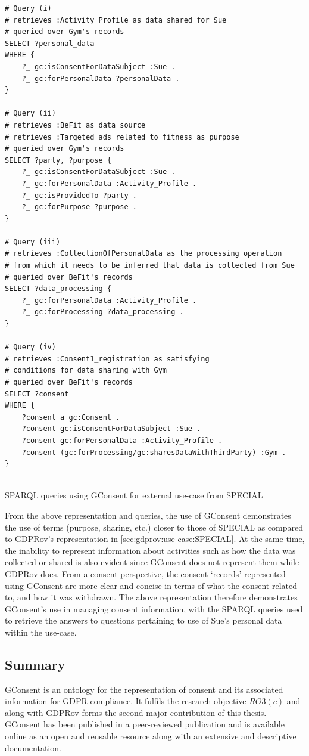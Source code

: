 \begin{listing}[htbp]
\begin{verbatim}
# Query (i)
# retrieves :Activity_Profile as data shared for Sue
# queried over Gym's records
SELECT ?personal_data
WHERE {
	?_ gc:isConsentForDataSubject :Sue .
	?_ gc:forPersonalData ?personalData .
}

# Query (ii)
# retrieves :BeFit as data source
# retrieves :Targeted_ads_related_to_fitness as purpose
# queried over Gym's records
SELECT ?party, ?purpose {
	?_ gc:isConsentForDataSubject :Sue .
	?_ gc:forPersonalData :Activity_Profile .
	?_ gc:isProvidedTo ?party .
	?_ gc:forPurpose ?purpose .
}

# Query (iii)
# retrieves :CollectionOfPersonalData as the processing operation
# from which it needs to be inferred that data is collected from Sue
# queried over BeFit's records
SELECT ?data_processing {
    ?_ gc:forPersonalData :Activity_Profile .
    ?_ gc:forProcessing ?data_processing .
}

# Query (iv)
# retrieves :Consent1_registration as satisfying
# conditions for data sharing with Gym
# queried over BeFit's records
SELECT ?consent
WHERE {
	?consent a gc:Consent .
	?consent gc:isConsentForDataSubject :Sue .
	?consent gc:forPersonalData :Activity_Profile .
	?consent (gc:forProcessing/gc:sharesDataWithThirdParty) :Gym .
}


\end{verbatim}
\caption{SPARQL queries using GConsent for external use-case from SPECIAL}
\label{code:gconsent:use-case:special-sparql}
\end{listing}

From the above representation and queries, the use of GConsent demonstrates the use of terms (purpose, sharing, etc.) closer to those of SPECIAL as compared to GDPRov's representation in \autoref{sec:gdprov:use-case:SPECIAL}.
At the same time, the inability to represent information about activities such as how the data was collected or shared is also evident since GConsent does not represent them while GDPRov does.
From a consent perspective, the consent `records' represented using GConsent are more clear and concise in terms of what the consent related to, and how it was withdrawn.
The above representation therefore demonstrates GConsent's use in managing consent information, with the SPARQL queries used to retrieve the answers to questions pertaining to use of Sue's personal data within the use-case.

\subsection*{Summary}
GConsent is an ontology for the representation of consent and its associated information for GDPR compliance. It fulfils the research objective $RO3(c)$ and along with GDPRov forms the second major contribution of this thesis.
GConsent has been published in a peer-reviewed publication and is available online as an open and reusable resource along with an extensive and descriptive documentation.

